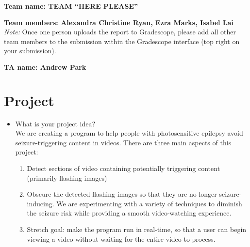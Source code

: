 \textbf{Team name:  TEAM ``HERE PLEASE''}

\textbf{Team members: Alexandra Christine Ryan, Ezra Marks, Isabel Lai}\\
\emph{Note:} Once one person uploads the report to Gradescope, please add all other team members to the submission within the Gradescope interface (top right on your submission).

\textbf{TA name: Andrew Park}

\section*{Project}
\begin{itemize}
  \item What is your project idea? \\ \newline
  We are creating a program to help people with photosensitive epilepsy avoid seizure-triggering content in videos. There are three main aspects of this project:
  \begin{enumerate}
    \item Detect sections of video containing potentially triggering content (primarily flashing images)
    \item Obscure the detected flashing images so that they are no longer seizure-inducing. We are experimenting with a variety of techniques to diminish the seizure risk while providing a smooth video-watching experience.
    \item Stretch goal: make the program run in real-time, so that a user can begin viewing a video without waiting for the entire video to process.
  \end{enumerate}


\end{itemize}
